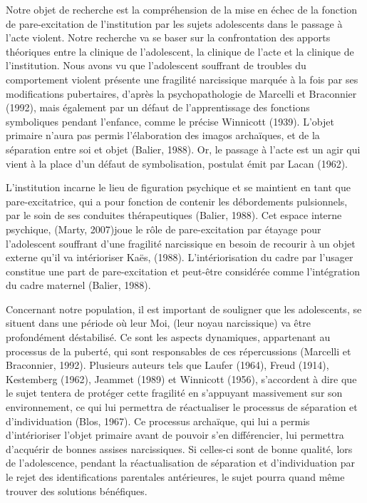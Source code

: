 \documentclass[12pt, a4paper]{book}
\begin{document}
\begin{spacing}{1.5}
Notre objet de recherche est la compréhension de la mise en échec de la fonction de pare-excitation de l'institution par les sujets adolescents dans le passage à l'acte violent. Notre recherche va se baser sur la confrontation des apports théoriques entre la clinique de l'adolescent, la clinique de l'acte et la clinique de l'institution. Nous avons vu que l'adolescent souffrant de troubles du comportement violent présente une fragilité narcissique marquée à la fois par ses modifications pubertaires, d'après la psychopathologie de Marcelli et Braconnier (1992), mais également par un défaut de l'apprentissage des fonctions symboliques pendant l'enfance, comme le précise Winnicott (1939). L'objet primaire n'aura pas permis l'élaboration des imagos archaïques, et de la séparation entre soi et objet (Balier, 1988). Or, le passage à l'acte est un agir qui vient à la place d'un défaut de symbolisation, postulat émit par Lacan (1962). 

L'institution incarne le lieu de figuration psychique et se maintient en tant que pare-excitatrice, qui a pour fonction de contenir les débordements pulsionnels, par le soin de ses conduites thérapeutiques (Balier, 1988). Cet espace interne psychique, (Marty, 2007)joue le rôle de pare-excitation par étayage pour l'adolescent souffrant d'une fragilité narcissique en besoin de recourir à un objet externe qu'il va intérioriser Kaës, (1988). L'intériorisation du cadre par l'usager constitue une part de pare-excitation et peut-être considérée comme l'intégration du cadre maternel (Balier, 1988).

Concernant notre population, il est important de souligner que les adolescents, se situent dans une période où leur Moi, (leur noyau narcissique) va être profondément déstabilisé. Ce sont  les aspects dynamiques, appartenant au processus de la puberté, qui sont responsables de ces répercussions (Marcelli et Braconnier, 1992). Plusieurs auteurs tels que Laufer (1964), Freud (1914), Kestemberg (1962), Jeammet (1989) et Winnicott (1956), s'accordent à dire que le sujet tentera de protéger cette fragilité en s'appuyant massivement sur son environnement, ce qui lui permettra de réactualiser le processus de séparation et d'individuation (Blos, 1967). Ce processus archaïque, qui lui a permis d'intérioriser l'objet primaire avant de pouvoir s'en différencier, lui permettra d'acquérir de bonnes assises narcissiques. Si celles-ci sont de bonne qualité, lors de l'adolescence, pendant la réactualisation de séparation et d'individuation par le rejet des identifications parentales antérieures, le sujet pourra quand même trouver des solutions bénéfiques.


\end{spacing}
\end{document}
